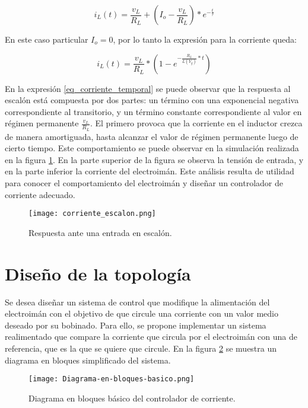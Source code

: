 \begin{equation} \label{eq_corriente_temporal_cond_iniciales}
	i_L(t)=\frac{v_L}{R_L} + (I_o-\frac{v_L}{R_L})*e^{-\frac{t}{\tau}}
\end{equation}

En este caso particular $I_o=0$, por lo tanto la expresión para la corriente queda:

\begin{equation} \label{eq_corriente_temporal}
	i_L(t)=\frac{v_L}{R_L}*(1-e^{-\frac{R_L}{L(Y_g)}*t})
\end{equation}



En la expresión \ref{eq_corriente_temporal} se puede observar que la respuesta al escalón está compuesta por dos partes: un término con una exponencial negativa correspondiente al transitorio, y un término constante correspondiente al valor en régimen permanente $\frac{v_L}{R_L}$. El primero provoca que la corriente en el inductor crezca de manera amortiguada, hasta alcanzar el valor de régimen permanente luego de cierto tiempo. Este comportamiento se puede observar en la simulación realizada en la figura \ref{fig:img_respuesta_escalon}. En la parte superior de la figura se observa la tensión de entrada, y en la parte inferior la corriente del electroimán. Este análisis resulta de utilidad para conocer el comportamiento del electroimán y diseñar un controlador de corriente adecuado.


\begin{figure}[H]
	\centering
	\texttt{[image: corriente\_escalon.png]}
	\caption{Respuesta ante una entrada en escalón.}
	\label{fig:img_respuesta_escalon}
\end{figure}


\section{Diseño de la topología}


Se desea diseñar un sistema de control que modifique la alimentación del electroimán con el objetivo de que circule una corriente con un valor medio deseado por su bobinado.  Para ello, se propone implementar un sistema realimentado que compare la corriente que circula por el electroimán con una de referencia, que es la que se quiere que circule. En la figura \ref{fig:img_diagrama_bloques_basico} se muestra un diagrama en bloques simplificado del sistema.

\begin{figure}[H]
	\centering
	\texttt{[image: Diagrama-en-bloques-basico.png]}
	\caption{Diagrama en bloques básico del controlador de corriente.}
	\label{fig:img_diagrama_bloques_basico}
\end{figure}

